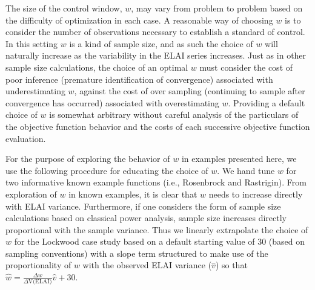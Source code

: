 \documentclass{article}
\begin{document}
%
The size of the control window, $w$, may vary from problem to problem based on 
the difficulty of optimization in each case. A reasonable way of choosing $w$ 
is to consider the number of observations necessary to establish a standard of 
control. In this setting $w$ is a kind of sample size, and as such the 
choice of $w$ will naturally increase as the variability in the ELAI series 
increases. Just as in other sample size calculations, the choice of an optimal 
$w$ must consider the cost of poor inference (premature identification of 
convergence) associated with underestimating $w$, against the cost of over 
sampling (continuing to sample after convergence has occurred) associated with 
overestimating $w$. Providing a default choice of $w$ is somewhat arbitrary 
without careful analysis of the particulars of the objective function behavior 
and the costs of each successive objective function evaluation. 

%
For the purpose of exploring the behavior of $w$ in examples presented here, 
we use the following procedure for educating the choice of $w$. We hand tune 
$w$ for two informative known example functions (i.e., Rosenbrock and 
Rastrigin). From exploration of $w$ in known examples, it is clear that $w$ 
needs to increase directly with ELAI variance. Furthermore, if one considers the form 
of sample size calculations based on classical power analysis, sample size 
increases directly proportional with the sample variance. Thus we linearly 
extrapolate the choice of $w$ for the Lockwood case study based on a default 
starting value of 30 (based on sampling conventions) with a slope term 
structured to make use of the proportionality of $w$ with the observed ELAI 
variance ($\hat v$) so that \mbox{$\hat w=\frac{\Delta w}{\Delta \text{V(ELAI)}}\hat v+30$.} %

% 
% 
% 
\end{document}
